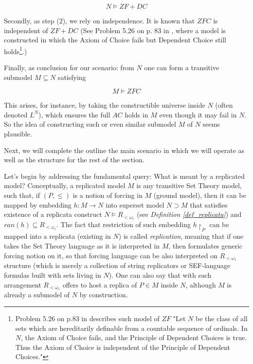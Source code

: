 \[ N \models ZF+DC \]

Secondly, as step (2), we rely on independence. It is known that $ZFC$ is independent of $ZF+DC$ (See Problem 5.26 on p. 83 in \cite{Jech1973AboutTA}, where a model is constructed in which the Axiom of Choice fails but Dependent Choice still holds\footnote{Problem 5.26 on p.83 in \cite{Jech1973AboutTA} describes such model of $ZF$ "Let $N$ be the class of all sets which are hereditarily definable from a countable sequence of ordinals. In $N$, the Axiom of Choice fails, and the Principle of Dependent Choices is true. Thus the Axiom of Choice is independent of the Principle of Dependent Choices."}.)

Finally, as conclusion for our scenario: from $N$ one can form a transitive submodel $M \subseteq N$ satisfying 

    \[ M \models ZFC \]

This arises, for instance, by taking the constructible universe inside $N$ (often denoted $L^N$), which ensures the full $AC$ holds in $M$ even though it may fail in $N$. So the idea of constructing such or even similar submodel $M$ of $N$ seems plausible.

Next, we will complete the outline the main scenario in which we will operate as well as the structure for the rest of the section.

Let's begin by addressing the fundamental query: What is meant by a replicated model? Conceptually, a replicated model $M$ is any transitive Set Theory model, such that, if $(P, \leq)$ is a notion of forcing in $M$ (ground model), then it can be mapped by embedding $h: M \to N$ into superset model $N \supset M$ that satisfies existence of a replicata construct $N \models R_{<\omega_1}$ (see \textit{Definition \ref{def_replicata}}) and $ran(h) \subseteq R_{<\omega_1}$. The fact that restriction of such embedding $h{\upharpoonright}_P$ can be mapped into a replicata (existing in $N$) is called \textit{replication}, meaning that if one takes the Set Theory language as it is interpreted in $M$, then formulates generic forcing notion on it, so that forcing language can be also interpreted on $R_{<\omega_1}$ structure (which is merely a collection of string replicators or SEF-language formulas built with sets living in $N$). One can also say that with such arrangement $R_{<\omega_1}$ offers to host a replica of $P \in M$ inside $N$, although $M$ is already a submodel of $N$ by construction. 

